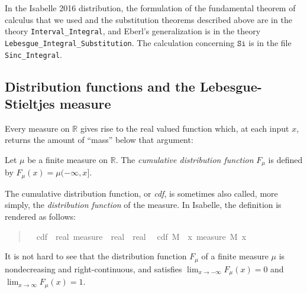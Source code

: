 \documentclass{svjour3}
\newcommand{\RR}{\mathbb{R}}
\newcommand{\fn}[1]{\mathtt{#1}} %
\begin{document}
In the Isabelle 2016 distribution, the formulation of the fundamental theorem of calculus that we used and the substitution theorems described above are in the theory \verb=Interval_Integral=, and Eberl's generalization is in the theory \verb=Lebesgue_Integral_Substitution=. The calculation concerning $\fn{Si}$ is in the file \verb=Sinc_Integral=.

\subsection{Distribution functions and the Lebesgue-Stieltjes measure}
\label{subsection:distribution:functions}

Every measure on $\RR$ gives rise to the real valued function which, at each input $x$, returns the amount of ``mass'' below that argument:

\begin{definition}
Let $\mu$ be a finite measure on $\RR$. The \emph{cumulative distribution function} $F_\mu$ is defined by $F_\mu(x) = \mu (-\infty, x]$.
\end{definition}
The cumulative distribution function, or \emph{cdf}, is sometimes also called, more simply, the \emph{distribution function} of the measure. In Isabelle, the definition is rendered as follows:

\begin{quote}
\begin{isabellebody}
\isamarkupfalse%
\isanewline
\ \ cdf\ {\isacharcolon}{\isacharcolon}\ {\isachardoublequoteopen}real\ measure\ {\isasymRightarrow}\ real\ {\isasymRightarrow}\ real{\isachardoublequoteclose}\isanewline
{}\isanewline
\ \ {\isachardoublequoteopen}cdf\ M\ {\isasymequiv}\ {\isasymlambda}x{\isachardot}\ measure\ M\ {\isacharbraceleft}{\isachardot}{\isachardot}x{\isacharbraceright}{\isachardoublequoteclose}
\end{isabellebody}
\end{quote}

It is not hard to see that the distribution function $F_\mu$ of a finite measure $\mu$ is nondecreasing and right-continuous, and satisfies $\lim_{x \rightarrow -\infty} F_\mu(x) = 0$ and \linebreak $\lim_{x \rightarrow \infty} F_\mu(x) = 1$.
\end{document}
